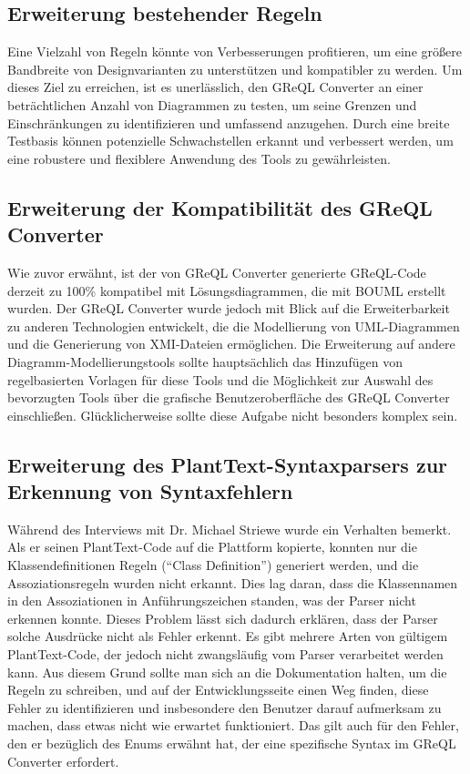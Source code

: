 \subsection{Erweiterung bestehender Regeln}

Eine Vielzahl von Regeln könnte von Verbesserungen profitieren, um eine größere Bandbreite von Designvarianten zu
unterstützen und kompatibler zu werden. Um dieses Ziel zu erreichen, ist es unerlässlich, den GReQL Converter an einer
beträchtlichen Anzahl von Diagrammen zu testen, um seine Grenzen und Einschränkungen zu identifizieren und umfassend
anzugehen. Durch eine breite Testbasis können potenzielle Schwachstellen erkannt und verbessert werden, um eine
robustere und flexiblere Anwendung des Tools zu gewährleisten.


\subsection{Erweiterung der Kompatibilität des GReQL Converter}

Wie zuvor erwähnt, ist der von GReQL Converter generierte GReQL-Code derzeit zu 100\% kompatibel mit Lösungsdiagrammen,
die mit BOUML erstellt wurden. Der GReQL Converter wurde jedoch mit Blick auf die Erweiterbarkeit zu anderen
Technologien entwickelt, die die Modellierung von UML-Diagrammen und die Generierung von XMI-Dateien ermöglichen. Die
Erweiterung auf andere Diagramm-Modellierungstools sollte hauptsächlich das Hinzufügen von regelbasierten Vorlagen für
diese Tools und die Möglichkeit zur Auswahl des bevorzugten Tools über die grafische Benutzeroberfläche des GReQL
Converter einschließen. Glücklicherweise sollte diese Aufgabe nicht besonders komplex sein.


\subsection{Erweiterung des PlantText-Syntaxparsers zur Erkennung von Syntaxfehlern}

Während des Interviews mit Dr. Michael Striewe wurde ein Verhalten bemerkt. Als er seinen PlantText-Code auf die
Plattform kopierte, konnten nur die Klassendefinitionen Regeln (``Class Definition'') generiert werden, und die
Assoziationsregeln wurden nicht erkannt. Dies lag daran, dass die Klassennamen in den Assoziationen in
Anführungszeichen standen, was der Parser nicht erkennen konnte. Dieses Problem lässt sich dadurch erklären, dass der
Parser solche Ausdrücke nicht als Fehler erkennt. Es gibt mehrere Arten von gültigem PlantText-Code, der jedoch nicht
zwangsläufig vom Parser verarbeitet werden kann. Aus diesem Grund sollte man sich an die Dokumentation halten, um die
Regeln zu schreiben, und auf der Entwicklungsseite einen Weg finden, diese Fehler zu identifizieren und insbesondere den
Benutzer darauf aufmerksam zu machen, dass etwas nicht wie erwartet funktioniert. Das gilt auch für den Fehler, den er
bezüglich des Enums erwähnt hat, der eine spezifische Syntax im GReQL Converter erfordert.


